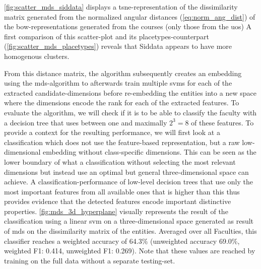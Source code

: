 \autoref{fig:scatter_mds_siddata} displays a \gls{tsne}-representation of the dissimilarity matrix generated from the normalized angular distances (\autoref{eq:norm_ang_dist}) of the \gls{bow}-representations generated from the courses (only those from the \gls{uos}) A first comparison of this scatter-plot and its placetypes-counterpart (\autoref{fig:scatter_mds_placetypes}) reveals that Siddata appears to have more homogenous clusters.

From this distance matrix, the algorithm subsequently creates an embedding using the \gls{mds}-algorithm to afterwards train multiple \glspl{svm} for each of the extracted candidate-dimensions before re-embedding the entities into a new space where the dimensions encode the \gls{rank} for each of the extracted features. To evaluate the algorithm, we will check if it is to be able to classify the faculty with a decision tree that uses between one and maximally $2^3=8$ of these features. To provide a context for the resulting performance, we will first look at a classification which does not use the feature-based representation, but a raw low-dimensional embedding without class-specific dimensions. This can be seen as the lower boundary of what a classification without selecting the most relevant dimensions but instead use an optimal but general three-dimensional space can achieve. A classification-performance of low-level decision trees that use only the most important features from all available ones that is higher than this thus provides evidence that the detected features encode important distinctive properties. \autoref{fig:mds_3d_hyperplane} visually represents the result of the classification using a linear \gls{svm} on a three-dimensional space generated as result of \gls{mds} on the dissimilarity matrix of the entities. Averaged over all Faculties, this classifier reaches a weighted accuracy of 64.3\% (unweighted accuracy 69.0\%, weighted F1: 0.414, unweighted F1: 0.269). Note that these values are reached by training on the full data without a separate testing-set.




